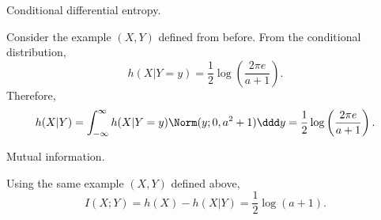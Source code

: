 \begin{example}
\exlabel

Conditional differential entropy.
\end{example}

\noindent Consider the example $(X,Y)$ defined from before. From the conditional distribution, 
\[h(X|Y=y) = \frac{1}{2}\log\left(\frac{2\pi e}{a+1}\right).\] 
Therefore, 
\[h(X|Y) = \int_{-\infty}^{\infty}h(X|Y=y)\Norm(y;0,a^2+1)\ddd y = \frac{1}{2} \log \left(\frac{2\pi e}{a+1}\right).\] 

\begin{example}
\exlabel

Mutual information.
\end{example}

\noindent Using the same example $(X,Y)$ defined above,
\[I(X;Y) = h(X) - h(X|Y) = \frac{1}{2}\log(a+1).\] 
